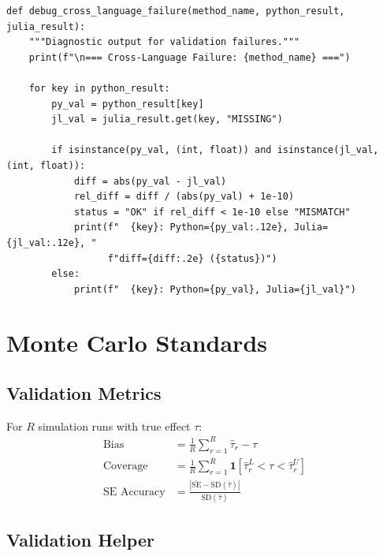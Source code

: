 \begin{verbatim}
def debug_cross_language_failure(method_name, python_result, julia_result):
    """Diagnostic output for validation failures."""
    print(f"\n=== Cross-Language Failure: {method_name} ===")

    for key in python_result:
        py_val = python_result[key]
        jl_val = julia_result.get(key, "MISSING")

        if isinstance(py_val, (int, float)) and isinstance(jl_val, (int, float)):
            diff = abs(py_val - jl_val)
            rel_diff = diff / (abs(py_val) + 1e-10)
            status = "OK" if rel_diff < 1e-10 else "MISMATCH"
            print(f"  {key}: Python={py_val:.12e}, Julia={jl_val:.12e}, "
                  f"diff={diff:.2e} ({status})")
        else:
            print(f"  {key}: Python={py_val}, Julia={jl_val}")
\end{verbatim}


\section{Monte Carlo Standards}

\subsection{Validation Metrics}

\begin{definition}
For $R$ simulation runs with true effect $\tau$:
\begin{align}
\text{Bias} &= \frac{1}{R} \sum_{r=1}^R \hat{\tau}_r - \tau \\
\text{Coverage} &= \frac{1}{R} \sum_{r=1}^R \mathbf{1}[\hat{\tau}_r^L < \tau < \hat{\tau}_r^U] \\
\text{SE Accuracy} &= \frac{\left| \overline{\text{SE}} - \text{SD}(\hat{\tau}) \right|}{\text{SD}(\hat{\tau})}
\end{align}
\end{definition}

\subsection{Validation Helper}

